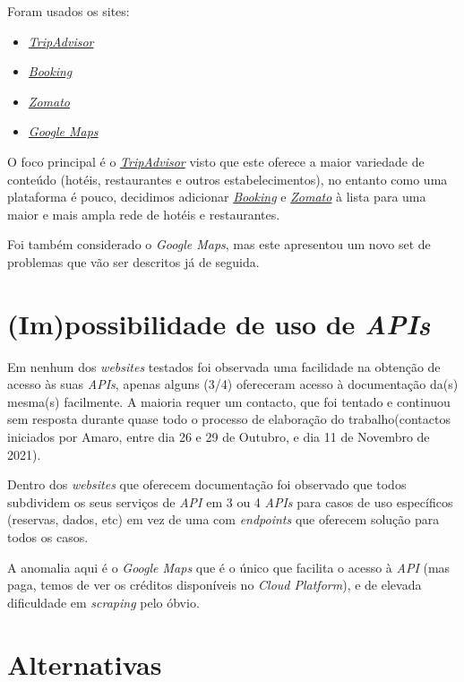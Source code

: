 Foram usados os sites:
\begin{itemize}
  \setlength\itemsep{0.05em}
  \item \textit{\href{https://www.tripadvisor.com/}{TripAdvisor}}
  \item \textit{\href{https://www.booking.com/}{Booking}}
  \item \textit{\href{https://www.zomato.com/}{Zomato}}
  \item \textit{\href{https://developers.google.com/maps}{Google Maps}}
\end{itemize}

O foco principal é o \textit{\href{https://www.tripadvisor.com/}{TripAdvisor}} visto que este oferece a maior variedade de conteúdo (hotéis, restaurantes e outros estabelecimentos), no entanto como uma plataforma é pouco, decidimos adicionar \textit{\href{https://www.booking.com/}{Booking}} e \textit{\href{https://www.zomato.com/}{Zomato}} à lista para uma maior e mais ampla rede de hotéis e restaurantes.

Foi também considerado o \textit{Google Maps}, mas este apresentou um novo set de problemas que vão ser descritos já de seguida.

\section{(Im)possibilidade de uso de \textit{APIs}}

Em nenhum dos \textit{websites} testados foi observada uma facilidade na obtenção de acesso às suas \textit{APIs}, apenas alguns (3/4) ofereceram acesso à documentação da(s) mesma(s) facilmente. A maioria requer um contacto, que foi tentado e continuou sem resposta durante quase todo o processo de elaboração do trabalho(contactos iniciados por Amaro, entre dia 26 e 29 de Outubro, e dia 11 de Novembro de 2021).

Dentro dos \textit{websites} que oferecem documentação foi observado que todos subdividem os seus serviços de \textit{API} em 3 ou 4 \textit{APIs} para casos de uso específicos (reservas, dados, etc) em vez de uma com \textit{endpoints} que oferecem solução para todos os casos.

A anomalia aqui é o \textit{Google Maps} que é o único que facilita o acesso à \textit{API} (mas paga, temos de ver os créditos disponíveis no \textit{Cloud Platform}), e de elevada dificuldade em \textit{scraping} pelo óbvio.

\section{Alternativas}

